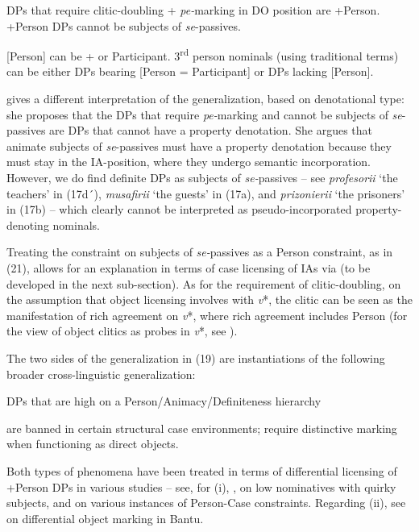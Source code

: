 \documentclass[output=paper]{langsci/langscibook}
\begin{document}
\ea%
    \label{ex:giurgea:21}
    \ea DPs that require clitic-doubling + \textit{pe-}marking in DO position are +Person.
      \ex +Person DPs cannot be subjects of \textit{se}{}-passives.
    \z
\z

[Person] can be + or \textminus{}Participant. 3\textsuperscript{rd} person nominals (using traditional terms) can be either DPs bearing [Person = \textminus{}Participant] or DPs lacking [Person].

\citet{Cornilescu1998} gives a different interpretation of the generalization, based on denotational type: she proposes that the DPs that require \textit{pe-}marking and cannot be subjects of \textit{se}{}-passives are DPs that cannot have a property denotation. She argues that animate subjects of \textit{se}{}-passives must have a property denotation because they must stay in the IA-position, where they undergo semantic incorporation. However, we do find definite DPs as subjects of \textit{se-}passives – see \textit{profesorii} ‘the teachers’ in (17d´), \textit{musafirii} ‘the guests’ in (17a), and \textit{prizonierii} ‘the prisoners’ in (17b) – which clearly cannot be interpreted as pseudo-incorporated property-denoting nominals.

Treating the constraint on subjects of \textit{se-}passives as a Person constraint, as in (21), allows for an explanation in terms of case licensing of IAs via  (to be developed in the next sub-section). As for the requirement of clitic-doubling, on the assumption that object licensing involves  with \textit{v}*, the clitic can be seen as the manifestation of rich agreement on \textit{v}*, where rich agreement includes Person (for the view of  object clitics as probes in \textit{v}*, see \citealt{Roberts2010}).

The two sides of the generalization in (19) are instantiations of the following broader cross-linguistic generalization:

\ea%
    DPs that are high on a Person\slash Animacy/Definiteness hierarchy\label{ex:giurgea:22}\\
        \begin{xlisti}
        \ex are banned in certain structural case environments;
        \ex require distinctive marking when functioning as direct objects.
        \end{xlisti}
\z

Both types of phenomena have been treated in terms of differential licensing of +Person DPs in various studies – see, for (i), \citet{Sigurðsson2004,Sigurðsson2011,Sigurðsson2012,Sigurðsson2008}, on  low nominatives with quirky subjects, and \citet{Rezac2011} on various instances of Person-Case constraints. Regarding (ii), see \citet{VanderWal2015} on differential object marking in Bantu.
\end{document}
